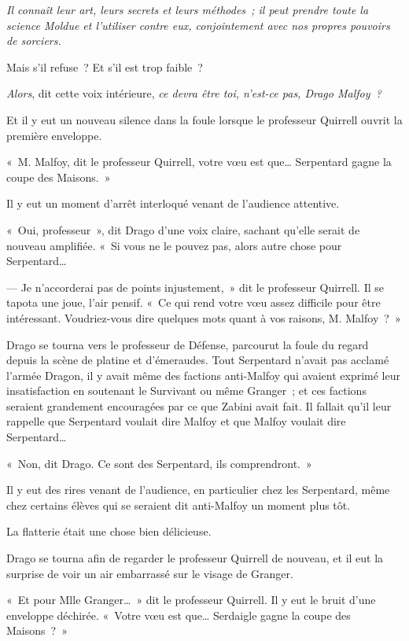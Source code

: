 \emph{Il connaît leur art, leurs secrets et leurs méthodes~; il peut prendre toute la science Moldue et l'utiliser contre eux, conjointement avec nos propres pouvoirs de sorciers.}

Mais s'il refuse~?
Et s'il est trop faible~?

\emph{Alors}, dit cette voix intérieure, \emph{ce devra être toi, n'est-ce pas, Drago Malfoy~?}

Et il y eut un nouveau silence dans la foule lorsque le professeur Quirrell ouvrit la première enveloppe.

«~M. Malfoy, dit le professeur Quirrell, votre vœu est que…
Serpentard gagne la coupe des Maisons.~»

Il y eut un moment d'arrêt interloqué venant de l'audience attentive.

«~Oui, professeur~», dit Drago d'une voix claire, sachant qu'elle serait de nouveau amplifiée.
«~Si vous ne le pouvez pas, alors autre chose pour Serpentard…

--- Je n'accorderai pas de points injustement,~» dit le professeur Quirrell.
Il se tapota une joue, l'air pensif.
«~Ce qui rend votre vœu assez difficile pour être intéressant.
Voudriez-vous dire quelques mots quant à vos raisons, M. Malfoy~?~»

Drago se tourna vers le professeur de Défense, parcourut la foule du regard depuis la scène de platine et d'émeraudes.
Tout Serpentard n'avait pas acclamé l'armée Dragon, il y avait même des factions anti-Malfoy qui avaient exprimé leur insatisfaction en soutenant le Survivant ou même Granger~; et ces factions seraient grandement encouragées par ce que Zabini avait fait.
Il fallait qu'il leur rappelle que Serpentard voulait dire Malfoy et que Malfoy voulait dire Serpentard…

«~Non, dit Drago.
Ce sont des Serpentard, ils comprendront.~»

Il y eut des rires venant de l'audience, en particulier chez les Serpentard, même chez certains élèves qui se seraient dit anti-Malfoy un moment plus tôt.

La flatterie était une chose bien délicieuse.

Drago se tourna afin de regarder le professeur Quirrell de nouveau, et il eut la surprise de voir un air embarrassé sur le visage de Granger.

«~Et pour Mlle Granger…~»
dit le professeur Quirrell.
Il y eut le bruit d'une enveloppe déchirée.
«~Votre vœu est que…
Serdaigle gagne la coupe des Maisons~?~»

